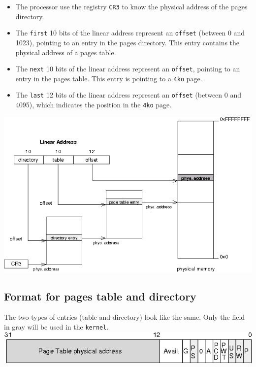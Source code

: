 \documentclass{42-en}
\begin{document}
	\begin{itemize}\itemsep1pt
		\item The processor use the registry \texttt{CR3} to know the physical
		address of the pages directory.
		\item The \texttt{first} 10 bits of the linear address represent
		an \texttt{offset} (between 0 and 1023), pointing to an entry
		in the pages directory. This entry contains the physical address
		of a pages table.
		\item The \texttt{next} 10 bits of the linear address represent an
		\texttt{offset}, pointing to an entry in the pages table. This entry
		is pointing	to a \texttt{4ko} page.
		\item The \texttt{last} 12 bits of the linear address represent an
		\texttt{offset} (between 0 and 4095), which indicates the position
		in the \texttt{4ko}	page.
	\end{itemize}
	\includegraphics[width=16cm]{./paging_memory.png}

\newpage

	\subsection{Format for pages table and directory}
	The two types of entries (table and directory) look like the same.
	Only the field in gray will be used in the \texttt{kernel}.\\
	\includegraphics[width=16cm]{./page_directory_entry.png}
\end{document}
